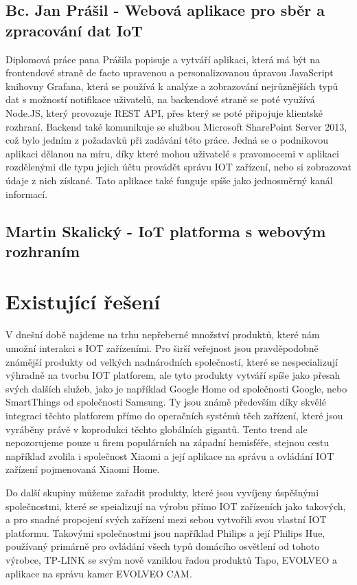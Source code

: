 \subsection{Bc. Jan Prášil - Webová aplikace pro sběr a zpracování dat IoT}

Diplomová práce pana Prášila popisuje a vytváří aplikaci, která má být na frontendové straně de facto upravenou a personalizovanou úpravou JavaScript knihovny Grafana, která se používá k analýze a zobrazování nejrůznějších typů dat s možností notifikace uživatelů, na backendové straně se poté využívá Node.JS, který provozuje REST API, přes který se poté připojuje klientské rozhraní. Backend také komunikuje se službou Microsoft SharePoint Server 2013, což bylo jedním z požadavků při zadávání této práce. Jedná se o podnikovou aplikaci dělanou na míru, díky které mohou uživatelé s pravomocemi v aplikaci rozdělenými dle typu jejich účtu provádět správu IOT zařízení, nebo si zobrazovat údaje z nich získané. Tato aplikace také funguje spíše jako jednosměrný kanál informací.

\subsection{Martin Skalický - IoT platforma s webovým rozhraním}



\section{Existující řešení}

V dnešní době najdeme na trhu nepřeberné množství produktů, které nám umožní interakci s IOT zařízeními. Pro širší veřejnost jsou pravděpodobně známější produkty od velkých nadnárodních společností, které se nespecializují výhradně na tvorbu IOT platforem, ale tyto produkty vytváří spíše jako přesah svých dalších služeb, jako je například Google Home od společnosti Google, nebo SmartThings od společnosti Samsung. Ty jsou známě především díky skvělé integraci těchto platforem přímo do operačních systémů těch zařízení, které jsou vyráběny právě v koprodukci těchto globálních gigantů. Tento trend ale nepozorujeme pouze u firem populárních na západní hemisféře, stejnou cestu například zvolila i společnost Xiaomi a její aplikace na správu a ovládání IOT zařízení pojmenovaná Xiaomi Home.

Do další skupiny můžeme zařadit produkty, které jsou vyvíjeny úspěšnými společnostmi, které se speializují na výrobu přímo IOT zařízeních jako takových, a pro snadné propojení svých zařízení mezi sebou vytvořili svou vlastní IOT platformu. Takovými společnostmi jsou například Philips a její Philips Hue, používaný primárně pro ovládání všech typů domácího osvětlení od tohoto výrobce, TP-LINK se svým nově vzniklou řadou produktů Tapo, EVOLVEO a aplikace na správu kamer EVOLVEO CAM.

